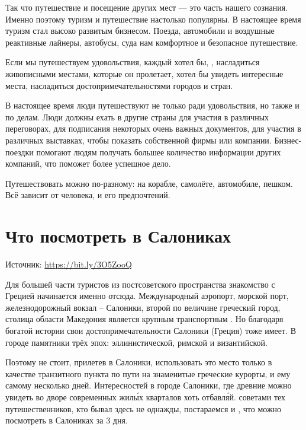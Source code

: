 Так что путешествие и посещение других мест --- это часть нашего сознания. Именно поэтому туризм и путешествие настолько популярны. В настоящее время туризм стал высоко развитым бизнесом. Поезда, автомобили и воздушные реактивные лайнеры, автобусы, суда  нам комфортное и безопасное путешествие.

Если мы путешествуем  удовольствия, каждый хотел бы, , насладиться живописными местами, которые он пролетает, хотел бы увидеть интересные места, насладиться достопримечательностями городов и стран.

В настоящее время люди путешествуют не только ради удовольствия, но также и по делам. Люди должны ехать в другие страны для участия в различных переговорах, для подписания некоторых очень важных документов, для участия в различных выставках, чтобы показать  собственной фирмы или компании. Бизнес-поездки помогают людям получать большее количество информации   других компаний, что поможет  более успешное дело.

Путешествовать можно по-разному: на корабле, самолёте, автомобиле, пешком. Всё зависит от человека, и его предпочтений.


\section{Что посмотреть в Салониках}
Источник: \url{https://bit.ly/3O5ZooQ}

Для большей части туристов из постсоветского пространства знакомство с Грецией начинается именно отсюда. Международный аэропорт, морской порт, железнодорожный вокзал – Салоники, второй по величине греческий город, столица области Македония является крупным транспортным . Но благодаря богатой истории свои достопримечательности Салоники (Греция) тоже имеет. В городе  памятники трёх эпох: эллинистической, римской и византийской.

Поэтому не стоит, прилетев в Салоники, использовать это место только в качестве транзитного пункта по пути на знаменитые греческие курорты,  и ему самому несколько дней. Интересностей в городе Салоники, где древние  можно увидеть во дворе современных жил\'{ы}х кварталов хоть отбавл\'{я}й.  советами тех путешественников, кто бывал здесь не однажды, постараемся  и , что можно посмотреть в Салониках за 3 дня.

